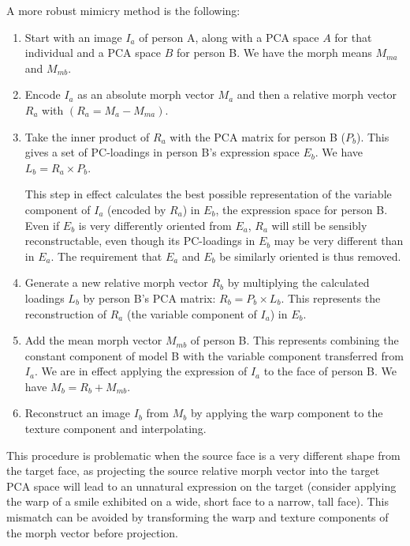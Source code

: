 \documentclass[runningheads]{llncs}
\begin{document}
A more robust mimicry method is the following:

\begin{enumerate}


\item	Start with an image $I_a$ of person A, along with a PCA space $A$ for that individual and a PCA space $B$ for person B. We have the morph means $M_{ma}$ and $M_{mb}$.

\item	Encode $I_a$ as an absolute morph vector $M_a$ and then a relative morph vector $R_a$ with $ (R_a = M_a - M_{ma})$.
\item	Take the inner product of $R_a$ with the PCA matrix for person B ($P_b$). This gives a set of PC-loadings in person B's expression space $E_b$. We have
$L_b = R_a \times P_b$.


This step in effect calculates the best possible representation of the variable component of $I_a$ (encoded by $R_a$) in $E_b$, the expression space for person B. Even if $E_b$ is very differently oriented from $E_a$, $R_a$ will still be sensibly reconstructable, even though its PC-loadings in $E_b$ may be very different than in $E_a$. The requirement that $E_a$ and $E_b$ be similarly oriented is thus removed.
\item	Generate a new relative morph vector $R_b$ by multiplying the calculated loadings $L_b$ by person B's PCA matrix:
$R_b = P_b \times L_b$.
This represents the reconstruction of $R_a$ (the variable component of $I_a$) in $E_b$.
\item	Add the mean morph vector $M_{mb}$ of person B. This represents combining the constant component of model B with the variable component transferred from $I_a$. We are in effect applying the expression of $I_a$ to the face of person B. We have $M_b = R_b + M_{mb}$.
\item	Reconstruct an image $I_b$ from $M_b$ by applying the warp component to the texture component and interpolating.


\end{enumerate}

This procedure is problematic when the source face is a very different shape from the target face, as projecting the source relative morph vector into the target PCA space will lead to an unnatural expression on the target (consider applying the warp of a smile exhibited on a wide, short face to a narrow, tall face). This mismatch can be avoided by transforming the warp and texture components of the morph vector before projection.
\end{document}
